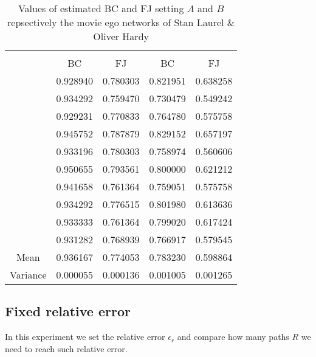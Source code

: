 		 \begin{table}[h]
		 	\centering
		 	\begin{tabular}{l|l|l|l|l|}
		 		\cline{2-5}
		 		&\multicolumn{2}{c|}{\fsamp} & \multicolumn{2}{c|}{\base}\\
		 		\cline{2-5}
		 		& \multicolumn{1}{c|}{BC} & \multicolumn{1}{c|}{FJ} & \multicolumn{1}{c|}{BC} & \multicolumn{1}{c|}{FJ}\\
		 		\cline{2-5}
		 		& 0.928940 & 0.780303 &  0.821951 & 0.638258\\
		 		& 0.934292 & 0.759470 &  0.730479 & 0.549242\\
		 		& 0.929231 & 0.770833 &  0.764780 & 0.575758\\
		 		& 0.945752 & 0.787879 &  0.829152 & 0.657197\\
		 		& 0.933196 & 0.780303 &  0.758974 & 0.560606\\
		 		& 0.950655 & 0.793561 &  0.800000 & 0.621212\\
		 		& 0.941658 & 0.761364 &  0.759051 & 0.575758\\
		 		& 0.934292 & 0.776515 &  0.801980 & 0.613636\\
		 		& 0.933333 & 0.761364 &  0.799020 & 0.617424\\
		 		& 0.931282 & 0.768939 &  0.766917 & 0.579545\\
		 		\hline
		 		\multicolumn{1}{|c|}{Mean} & 0.936167 & 0.774053 & 0.783230 & 0.598864\\
		 		\multicolumn{1}{|c|}{Variance} & 0.000055 & 0.000136 & 0.001005 & 0.001265\\
		 		\hline  %
		 	\end{tabular}
		 	\caption{Values of estimated BC and FJ setting $A$ and $B$ repsectively the movie ego networks of Stan Laurel \& Oliver Hardy }
		 	\label{table:stanlio}
		 \end{table}
	\subsection*{Fixed relative error}
	
	In this experiment we set the relative error $\epsilon_{r}$ and compare how many paths $R$ we need to reach such relative error.\\
	
